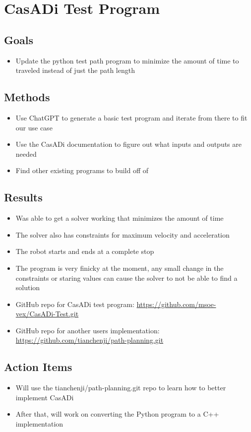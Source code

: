 \section{CasADi Test Program}

\subsection{Goals}
\begin{itemize}
    \item Update the python test path program to minimize the amount of time to traveled instead of just the path length
\end{itemize}

\subsection{Methods}
\begin{itemize}
    \item Use ChatGPT to generate a basic test program and iterate from there to fit our use case
    \item Use the CasADi documentation to figure out what inputs and outputs are needed
    \item Find other existing programs to build off of
\end{itemize}

\subsection{Results}
\begin{itemize}
    \item Was able to get a solver working that minimizes the amount of time
    \item The solver also has constraints for maximum velocity and acceleration
    \item The robot starts and ends at a complete stop
    \item The program is very finicky  at the moment, any small change in the constraints or staring values can cause the solver to not be able to find a solution
    \item GitHub repo for CasADi test program: \href{https://github.com/msoe-vex/CasADi-Test.git}{https://github.com/msoe-vex/CasADi-Test.git}
    \item GitHub repo for another users implementation: \href{https://github.com/tianchenji/path-planning.git}{https://github.com/tianchenji/path-planning.git}
\end{itemize}

\subsection{Action Items}
\begin{itemize}
    \item Will use the tianchenji/path-planning.git repo to learn how to better implement CasADi
    \item After that, will work on converting the Python program to a C++ implementation
\end{itemize}
